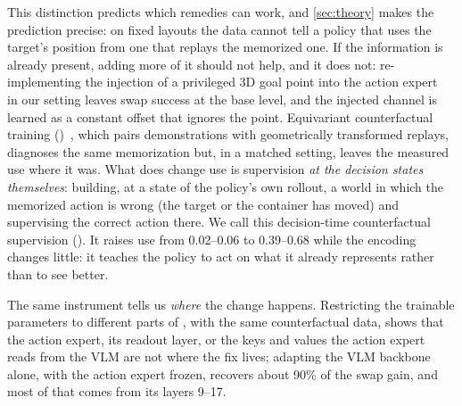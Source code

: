 This distinction predicts which remedies can work, and \cref{sec:theory} makes the prediction precise: on fixed layouts
the data cannot tell a policy that uses the target's position from one that replays the memorized one.
If the information is already present, adding more of it should not help, and it does not: re-implementing the injection
of a privileged 3D goal point into the action expert~\cite{tsai2026point} in our setting leaves swap success at the base
level, and the injected channel is learned as a constant offset that ignores the point.
Equivariant counterfactual training (\ect)~\cite{chen2026ect}, which pairs demonstrations with geometrically transformed
replays, diagnoses the same memorization but, in a matched setting, leaves the measured use where it was.
What does change use is supervision \emph{at the decision states themselves}: building, at a state of the policy's own
rollout, a world in which the memorized action is wrong (the target or the container has moved) and supervising the
correct action there.
We call this decision-time counterfactual supervision (\ours).
It raises use from 0.02--0.06 to 0.39--0.68 while the encoding changes little: it teaches the policy to act on what it
already represents rather than to see better.

The same instrument tells us \emph{where} the change happens.
Restricting the trainable parameters to different parts of \pizf, with the same counterfactual data, shows that the
action expert, its readout layer, or the keys and values the action expert reads from the VLM are not where the fix lives;
adapting the VLM backbone alone, with the action expert frozen, recovers about 90\% of the swap gain, and most of that
comes from its layers 9--17.

